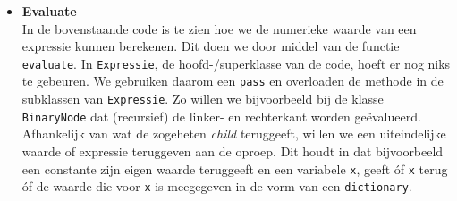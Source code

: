 \documentclass[12pt]{article}
\begin{document}
\begin{itemize}
\item \textbf{Evaluate}\\
In de bovenstaande code is te zien hoe we de numerieke waarde van een expressie kunnen berekenen. Dit doen we door middel van de functie \texttt{evaluate}. In \texttt{Expressie}, de hoofd-/superklasse van de code, hoeft er nog niks te gebeuren. We gebruiken daarom een \texttt{pass} en overloaden de methode in de subklassen van \texttt{Expressie}. Zo willen we bijvoorbeeld bij de klasse \texttt{BinaryNode} dat (recursief) de linker- en rechterkant worden ge\"{e}valueerd. Afhankelijk van wat de zogeheten \textit{child} teruggeeft, willen we een uiteindelijke waarde of expressie teruggeven aan de oproep. Dit houdt in dat bijvoorbeeld een constante zijn eigen waarde teruggeeft en een variabele \texttt{x}, geeft \'{o}f \texttt{x} terug \'{o}f de waarde die voor \texttt{x} is meegegeven in de vorm van een \texttt{dictionary}.
\end{itemize}
\vspace{1pc}
\end{document}
